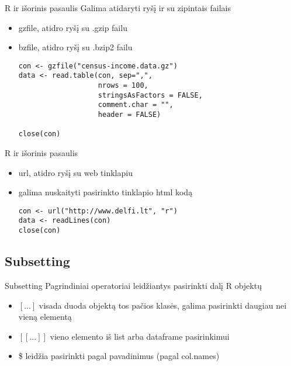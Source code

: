 \documentclass[11pt,xcolor=table]{beamer}
\begin{document}
\begin{frame}[fragile]{R ir išorinis pasaulis}
Galima atidaryti ryšį ir su zipintais failais
\begin{itemize}
\item gzfile, atidro ryšį su .gzip failu
\item bzfile, atidro ryšį su .bzip2 failu
\begin{lstlisting}
con <- gzfile("census-income.data.gz")
data <- read.table(con, sep=",", 
                   nrows = 100, 
                   stringsAsFactors = FALSE, 
                   comment.char = "", 
                   header = FALSE)

close(con)
\end{lstlisting}
\end{itemize}
\end{frame}


\begin{frame}[fragile]{R ir išorinis pasaulis}
\begin{itemize}
\item url, atidro ryšį su web tinklapiu
\item galima nuskaityti pasirinkto tinklapio html kodą
\begin{lstlisting}
con <- url("http://www.delfi.lt", "r")
data <- readLines(con)
close(con)
\end{lstlisting}
\end{itemize}
\end{frame}


\subsection{Subsetting}
\begin{frame}[fragile]{Subsetting}
Pagrindiniai operatoriai leidžiantys pasirinkti dalį R objektų
\begin{itemize}
\item $[...]$ visada duoda objektą tos pačios klasės, galima pasirinkti daugiau nei vieną elementą
\item $[[...]]$ vieno elemento iš list arba dataframe pasirinkimui
\item \$ leidžia pasirinkti pagal pavadinimus (pagal col.names)
\end{itemize}
\end{frame}
\end{document}
